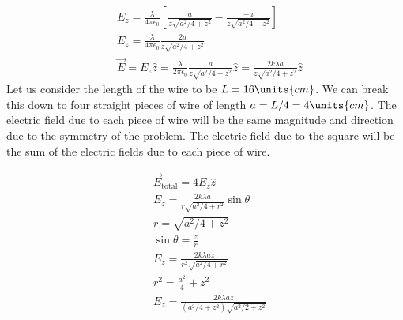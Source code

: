 {\begin{enumerate}
\begin{align*}
        &E_z = \frac{\lambda}{4\pi\epsilon_0}\left[\frac{a}{z\sqrt{a^2/4+z^2}}-\frac{-a}{z\sqrt{a^2/4+z^2}}\right]\\
        &E_z = \frac{\lambda}{4\pi\epsilon_0}\frac{2a}{z\sqrt{a^2/4+z^2}}\\
        &\vec{E}=E_z\hat{z}=\frac{\lambda}{2\pi\epsilon_0}\frac{a}{z\sqrt{a^2/4+z^2}}\hat{z}=\frac{2k\lambda a}{z\sqrt{a^2/4+z^2}}\hat{z}
    \end{align*}
    Let us consider the length of the wire to be $L=16\units{cm}$. We can break this down to four straight pieces of wire of length $a=L/4=4\units{cm}$. The electric field due to each piece of wire will be the same magnitude and direction due to the symmetry of the problem. The electric field due to the square will be the sum of the electric fields due to each piece of wire.
    \begin{center}
        \end{center}
    \begin{align*}
        &\vec{E}_\text{total}=4E_z\hat{z}\\
        &E_z=\frac{2k\lambda a}{r\sqrt{a^2/4+r^2}}\sin\theta\\
        &r=\sqrt{a^2/4+z^2}\\
        &\sin\theta=\frac{z}{r}\\
        &E_z=\frac{2k\lambda az}{r^2\sqrt{a^2/4+r^2}}\\
        &r^2=\frac{a^2}{4}+z^2\\
        &E_z=\frac{2k\lambda az}{(a^2/4+z^2)\sqrt{a^2/2+z^2}}\\

\end{align*}
\end{enumerate}}

